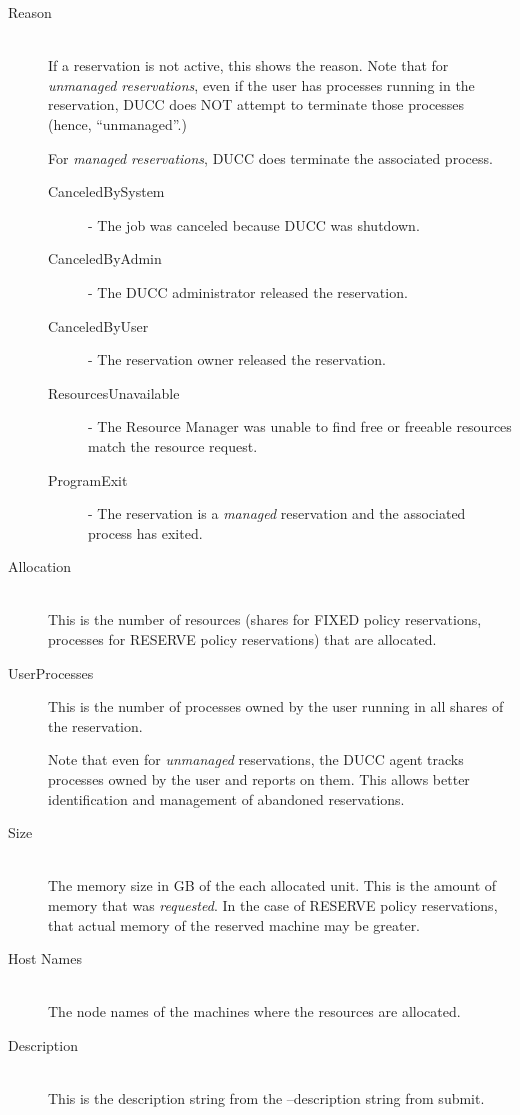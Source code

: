 \begin{description}
\item[Reason] \hfill \\


  If a reservation is not active, this shows the reason.  Note that for
  {\em unmanaged reservations}, even if the user has processes running in the
  reservation, DUCC does NOT attempt to terminate those processes (hence, ``unmanaged''.)

  For {\em managed reservations}, DUCC does terminate the associated process.

  \begin{description}
  \item[CanceledBySystem] - The job was canceled because DUCC was shutdown. 
  \item[CanceledByAdmin] - The DUCC administrator released the reservation. 
  \item[CanceledByUser] - The reservation owner released the reservation. 
  \item[ResourcesUnavailable] - The Resource Manager was unable to find free or freeable resources 
    match the resource request. 
  \item[ProgramExit] - The reservation is a {\em managed} reservation and the associated
    process has exited.
  \end{description}

\item[Allocation] \hfill \\
  This is the number of resources (shares for FIXED policy reservations, processes for
  RESERVE policy reservations) that are allocated.

\item[UserProcesses] This is the number of processes owned by the user running in all
  shares of the reservation.  
  
  Note that even for {\em unmanaged} reservations, the DUCC agent tracks processes owned
  by the user and reports on them.  This allows better identification and management of
  abandoned reservations.

\item[Size] \hfill \\
  The memory size in GB of the each allocated unit.  This is the amount of memory that
  was {\em requested}.  In the case of RESERVE policy reservations, that actual memory
  of the reserved machine may be greater.
  
\item[Host Names] \hfill \\
  The node names of the machines where the resources are allocated.
  
\item[Description] \hfill \\
  This is the description string from the --description string from submit.
\end{description}

